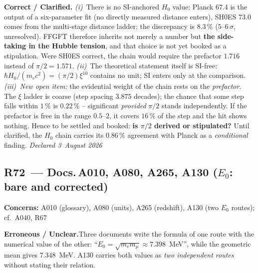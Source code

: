 \smallskip\noindent\textbf{Correct / Clarified.}\quad
\emph{(i)}~There is no SI-anchored $H_0$ value: Planck $67.4$ is the
output of a six-parameter fit (no directly measured distance enters),
SH0ES $73.0$ comes from the multi-stage distance ladder; the discrepancy
is $8.3\,\%$ ($5$--$6\,\sigma$, unresolved). FFGFT therefore inherits
not merely a number but \textbf{the side-taking in the Hubble tension},
and that choice is not yet booked as a stipulation. Were SH0ES correct,
the chain would require the prefactor $1.716$ instead of
$\pi/2 = 1.571$. \emph{(ii)}~The theoretical statement itself is
SI-free: $\hbar H_0/(m_ec^2) = (\pi/2)\xi^{10}$ contains no unit; SI
enters only at the comparison. \emph{(iii)~New open item:} the
evidential weight of the chain rests on the \emph{prefactor}. The $\xi$
ladder is coarse (step spacing $3.875$ decades); the chance that some
step falls within $1\,\%$ is $0.22\,\%$ -- significant \emph{provided}
$\pi/2$ stands independently. If the prefactor is free in the range
$0.5$--$2$, it covers $16\,\%$ of the step and the hit shows nothing.
Hence to be settled and booked: \textbf{is $\pi/2$ derived or
stipulated?} Until clarified, the $H_0$ chain carries its $0.86\,\%$
agreement with Planck as a \emph{conditional} finding.
\emph{Declared 3~August 2026}

\medskip

\subsection*{R72~--- Docs.\,A010, A080, A265, A130 ($E_0$: bare and
corrected)}

\noindent\textbf{Concerns:} A010 (glossary), A080 (units), A265
(redshift), A130 (two $E_0$ routes); cf.\ A040, R67

\smallskip\noindent\textbf{Erroneous / Unclear.}\quad Three documents
write the formula of one route with the numerical value of the other:
\enquote{$E_0 = \sqrt{m_em_\mu} \approx 7.398$~MeV}, while the geometric
mean gives $7.348$~MeV. A130 carries both values as \emph{two
independent routes} without stating their relation.

